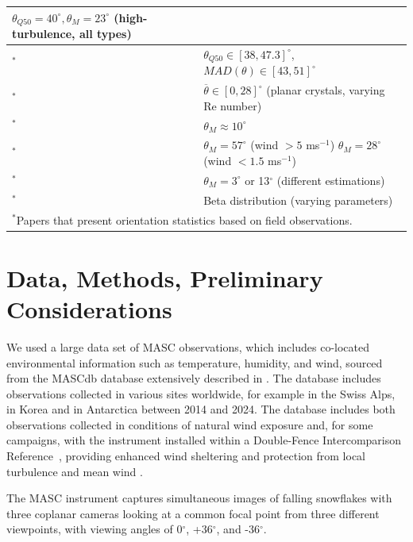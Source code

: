 \documentclass[draft]{agujournal2019}
\begin{document}
\begin{table}
\begin{tabular}{l p{90mm}}
   $\theta_{Q50}= 40^\circ, \theta_{M} = 23^\circ$ (high-turbulence, all types) \\
   \hline
   \cite{Gergely_JGRA_2016}$^*$ &  $\theta_{Q50} \in [38,47.3]^\circ$, $MAD(\theta) \in [43,51]^\circ$ \\
   \hline
   \cite{Stout_ACP_2024}$^*$ &  $\overline{\theta} \in [0,28]^\circ$ (planar crystals, varying Re number)\\
   \hline
   \cite{Jiang_JAS_2019}$^*$ & $\theta_{M}\approx 10^\circ$ \\
   \hline
   \cite{Fitch_AMT_2021}$^*$ & $\theta_{M} = 57^\circ$ (wind $> 5$ ms$^{-1}$) \newline
   $\theta_{M} = 28^\circ$ (wind $< 1.5$ ms$^{-1}$) \\
   \hline
   \cite{Fitch_JGR_2022}$^*$ & $\theta_{M} = 3^\circ$ or  13$^\circ$ (different estimations)  \\
   \hline
   \cite{Schrom_JAS_2023}$^*$ & Beta distribution (varying parameters) \\
   \hline
    \multicolumn{2}{l}{$^{*}$Papers that present orientation statistics based on field observations.}
 \end{tabular}
 \end{table}

 
\section{Data, Methods, Preliminary Considerations}

We used a large data set of MASC observations, which includes co-located environmental information such as temperature, humidity, and wind, sourced from the MASCdb database extensively described in \cite{Grazioli_SD_2022}. The database includes observations collected in various sites worldwide, for example in the Swiss Alps, in Korea and in Antarctica between 2014 and 2024. The database includes both observations collected in conditions of natural wind exposure and, for some campaigns, with the instrument installed within a Double-Fence Intercomparison Reference~\cite<DFIR, see for example>{Smith_HESS_2020}, providing enhanced wind sheltering and protection from local turbulence and mean wind . 

The MASC instrument captures simultaneous images of falling snowflakes with three coplanar cameras looking at a common focal point from three different viewpoints, with viewing angles of 0$^\circ$, +36$^\circ$, and -36$^\circ$.
\end{document}
